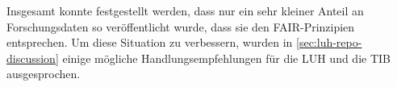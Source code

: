 Insgesamt konnte festgestellt werden, dass nur ein sehr kleiner Anteil an Forschungsdaten so veröffentlicht wurde, dass sie den FAIR-Prinzipien entsprechen.
Um diese Situation zu verbessern, wurden in \cref{sec:luh-repo-discussion} einige mögliche Handlungsempfehlungen für die LUH und die TIB ausgesprochen.
